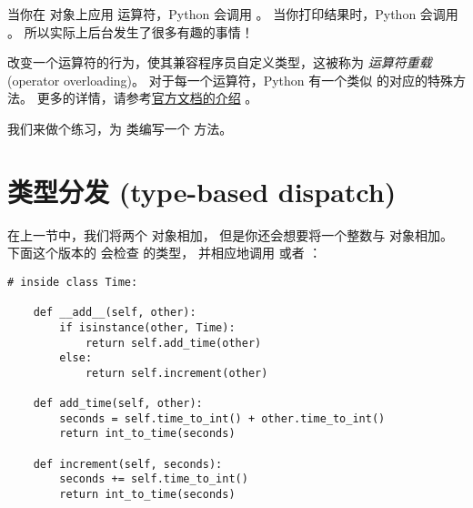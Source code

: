 当你在  对象上应用 \li{+} 运算符，Python 会调用  。
当你打印结果时，Python 会调用  。
所以实际上后台发生了很多有趣的事情！



改变一个运算符的行为，使其兼容程序员自定义类型，这被称为
{\em 运算符重载} (operator overloading)。
对于每一个运算符，Python 有一个类似  的对应的特殊方法。
更多的详情，请参考\href{http://docs.python.org/3/reference/datamodel.html#specialnames}{官方文档的介绍} 。


我们来做个练习，为  类编写一个  方法。

\section{类型分发 (type-based dispatch)}


在上一节中，我们将两个 对象相加，
但是你还会想要将一个整数与 对象相加。
下面这个版本的 会检查 的类型，
并相应地调用 或者 ：

\begin{lstlisting}
# inside class Time:

    def __add__(self, other):
        if isinstance(other, Time):
            return self.add_time(other)
        else:
            return self.increment(other)

    def add_time(self, other):
        seconds = self.time_to_int() + other.time_to_int()
        return int_to_time(seconds)

    def increment(self, seconds):
        seconds += self.time_to_int()
        return int_to_time(seconds)
\end{lstlisting}

